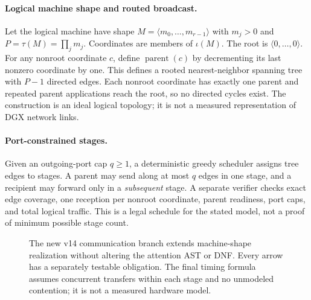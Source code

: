\documentclass[11pt]{article}
\begin{document}
\paragraph{Logical machine shape and routed broadcast.}
Let the logical machine have shape $M=\langle m_0,\ldots,m_{r-1}\rangle$ with $m_j>0$ and $P=\tau(M)=\prod_j m_j$. Coordinates are members of $\iota(M)$. The root is $\langle0,\ldots,0\rangle$. For any nonroot coordinate $c$, define $\operatorname{parent}(c)$ by decrementing its last nonzero coordinate by one. This defines a rooted nearest-neighbor spanning tree with $P-1$ directed edges. Each nonroot coordinate has exactly one parent and repeated parent applications reach the root, so no directed cycles exist. The construction is an ideal logical topology; it is not a measured representation of DGX network links.

\paragraph{Port-constrained stages.}
Given an outgoing-port cap $q\geq1$, a deterministic greedy scheduler assigns tree edges to stages. A parent may send along at most $q$ edges in one stage, and a recipient may forward only in a \emph{subsequent} stage. A separate verifier checks exact edge coverage, one reception per nonroot coordinate, parent readiness, port caps, and total logical traffic. This is a legal schedule for the stated model, not a proof of minimum possible stage count.

\begin{figure}[htbp]\centering
\setlength{\fboxsep}{7pt}
\caption{The new v14 communication branch extends machine-shape realization without altering the attention AST or DNF. Every arrow has a separately testable obligation. The final timing formula assumes concurrent transfers within each stage and no unmodeled contention; it is not a measured hardware model.}\label{fig:v14comm}
\end{figure}
\end{document}
